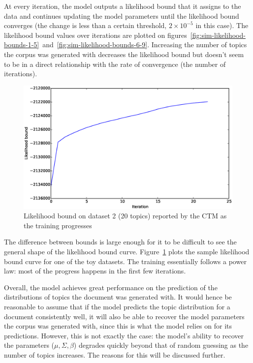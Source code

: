 \documentclass[12pt,a4paper,twoside,openright]{report}
\begin{document}
At every iteration, the model outputs a likelihood bound that it assigns to the data and continues updating the model parameters until the likelihood bound converges (the change is less than a certain threshold, $2\times10^{-5}$ in this case). The likelihood bound values over iterations are plotted on figures~\ref{fig:sim-likelihood-bounds-1-5}~and~\ref{fig:sim-likelihood-bounds-6-9}. Increasing the number of topics the corpus was generated with decreases the likelihood bound but doesn't seem to be in a direct relationship with the rate of convergence (the number of iterations).

\begin{figure}[!htb]
\includegraphics[width=\textwidth]{sim-likelihood-bounds-k-20.eps}
\caption{Likelihood bound on dataset 2 (20 topics) reported by the CTM as the training progresses}
\label{fig:sim-likelihood-bounds-k-20}
\end{figure}

The difference between bounds is large enough for it to be difficult to see the general shape of the likelihood bound curve. Figure~\ref{fig:sim-likelihood-bounds-k-20} plots the sample likelihood bound curve for one of the toy datasets. The training essentially follows a power law: most of the progress happens in the first few iterations.

Overall, the model achieves great performance on the prediction of the distributions of topics the document was generated with. It would hence be reasonable to assume that if the model predicts the topic distribution for a document consistently well, it will also be able to recover the model parameters the corpus was generated with, since this is what the model relies on for its predictions. However, this is not exactly the case: the model's ability to recover the parameters ($\mu, \Sigma, \beta$) degrades quickly beyond that of random guessing as the number of topics increases. The reasons for this will be discussed further.
\end{document}
